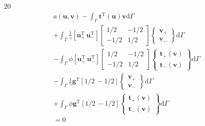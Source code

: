 \documentclass[a4paper,12pt]{article}
\begin{document}
20
\begin{equation}
\begin{split}
a(\mathbf{u},\mathbf{v})
-
\int_\Gamma
\mathbf{t}^\textrm{T}(\mathbf{u})\mathbf{v}
\textrm{d}\Gamma
\\+
\int_\Gamma
\frac{1}{\gamma}
[ \mathbf{u}_+^\textrm{T}\, \mathbf{u}_-^\textrm{T} ]
\left[
\begin{array}{cc}
1/2 & -1/2\\
-1/2 & 1/2
\end{array}
\right]
\left\{
\begin{array}{c}
\mathbf{v}_+ \\ \mathbf{v}_-
\end{array}
\right\}
\textrm{d}\Gamma
\\-
\int_\Gamma
\phi
[\mathbf{u}_+^\textrm{T}\, \mathbf{u}_-^\textrm{T}]
\left[
\begin{array}{cc}
1/2 & -1/2\\
-1/2 & 1/2
\end{array}
\right]
\left\{
\begin{array}{c}
\mathbf{t}_+(\mathbf{v})\\ \mathbf{t}_-(\mathbf{v})
\end{array}
\right\}
\textrm{d}\Gamma
\\-
\int_\Gamma
\frac{1}{\gamma}
\mathbf{g}^\textrm{T}
[ 1/2\, -1/2]
\left\{
\begin{array}{c}
\mathbf{v}_+ \\ \mathbf{v}_-
\end{array}
\right\}
\textrm{d}\Gamma
\\+
\int_\Gamma
\phi\mathbf{g}^\textrm{T}
[ 1/2\, -1/2]
\left\{
\begin{array}{c}
\mathbf{t}_+(\mathbf{v})\\ \mathbf{t}_-(\mathbf{v})
\end{array}
\right\}
\textrm{d}\Gamma
\\=
0
\end{split}
\end{equation}
\end{document}
